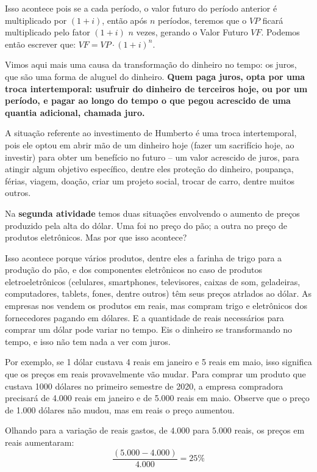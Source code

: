 Isso acontece pois se a cada período, o valor futuro do período anterior é multiplicado por $(1+i)$, então após $n$ períodos, teremos que o $\mathit{VP}$  ficará multiplicado pelo fator $(1+i)$ $n$ vezes, gerando o Valor Futuro $\mathit{VF}$. Podemos então escrever que: $\mathit{VF}=\mathit{VP}\cdot(1+i)^n$. 

Vimos aqui mais uma causa da transformação do dinheiro no tempo: os juros, que são uma forma de aluguel do dinheiro. \textbf{Quem paga juros, opta por uma troca intertemporal: usufruir do dinheiro de terceiros hoje, ou por um período, e pagar ao longo do tempo o que pegou acrescido de uma quantia adicional, chamada juro.}

A situação referente ao investimento de Humberto é uma troca intertemporal, pois ele optou em abrir mão de um dinheiro hoje (fazer um sacrifício hoje, ao investir) para obter um benefício no futuro – um valor acrescido de juros, para atingir algum objetivo específico, dentre eles proteção do dinheiro, poupança, férias, viagem, doação, criar um projeto social, trocar de carro, dentre muitos outros. 

Na \textbf{segunda atividade} temos duas situações envolvendo o aumento de preços produzido pela alta do dólar. Uma foi no preço do pão; a outra no preço de produtos eletrônicos. Mas por que isso acontece?

Isso acontece porque vários produtos, dentre eles a farinha de trigo para a produção do pão, e dos componentes eletrônicos no caso de produtos eletroeletrônicos (celulares, smartphones, televisores, caixas de som, geladeiras, computadores, tablets, fones, dentre outros) têm seus preços atrlados ao dólar. As empresas nos vendem os produtos em reais, mas compram trigo e eletrônicos dos fornecedores pagando em dólares. E a quantidade de reais necessários para comprar um dólar pode variar no tempo. Eis o dinheiro se transformando no tempo, e isso não tem nada a ver com juros.

Por exemplo, se 1 dólar custava 4 reais em janeiro e 5 reais em maio, isso significa que os preços em reais provavelmente vão mudar. Para comprar um produto que custava 1000 dólares no primeiro semestre de 2020, a empresa compradora precisará de 4.000 reais em janeiro e de 5.000 reais em maio. Observe que o preço de 1.000 dólares não mudou, mas em reais o preço aumentou.

Olhando para a variação de reais gastos, de $4.000$ para $5.000$ reais, os preços em reais aumentaram:
\begin{equation*}
\frac{(5.000-4.000)}{4.000}=25\%
\end{equation*}


